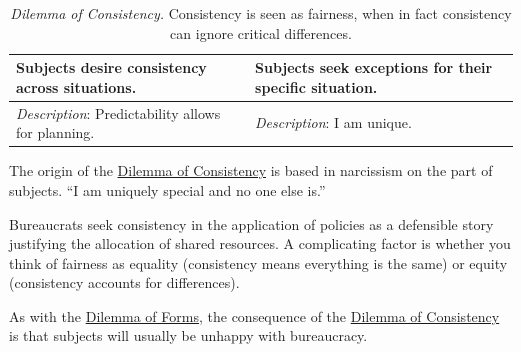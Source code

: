 

\begin{center}
\begin{table}[H] %
\begin{tabular}{ | m{\dilemmatablewidth}| m{\dilemmatablewidth} | } 
  \hline
  \textbf{Subjects desire consistency across situations.} &
  \textbf{Subjects seek exceptions for their specific situation.} \\
  \hline
  \textit{Description}: Predictability allows for planning. & 
  \textit{Description}: I am unique. \\
  \hline
\end{tabular}
\caption{\textit{Dilemma of Consistency.}
Consistency is seen as fairness, when in fact consistency can ignore critical differences. %
}
\label{table:dilemma-subject-consistency-per-situation}
\end{table}
\end{center}

The origin of the \hyperref[table:dilemma-subject-consistency-per-situation]{Dilemma of Consistency} is based in narcissism on the part of subjects. ``I am uniquely special and no one else is.''  

Bureaucrats seek consistency in the application of policies as a defensible story justifying the allocation of shared resources. A complicating factor is whether you think of fairness as equality (consistency means everything is the same) or equity (consistency accounts for differences). 

As with the \hyperref[table:dilemma-subject-forms]{Dilemma of Forms}, the consequence of the \hyperref[table:dilemma-subject-consistency-per-situation]{Dilemma of Consistency} is that subjects will usually be unhappy with bureaucracy. 

